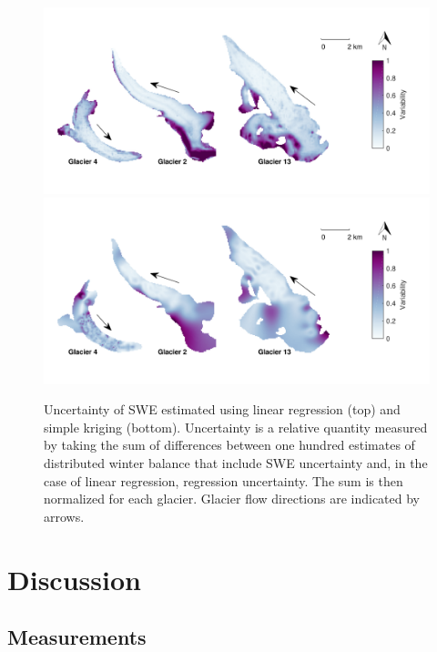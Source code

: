 \documentclass[twocolumn, letterpaper]{igs}
\begin{document}
\begin{figure}
	\centering
	\includegraphics[width =\textwidth]{SpatialVar_LR.pdf}\\
	\vspace{-20 mm}
	\includegraphics[width =\textwidth]{SpatialVar_SK.pdf}\\
	\caption{Uncertainty of SWE estimated using linear regression (top) and simple kriging (bottom). Uncertainty is a relative quantity measured by taking the sum of differences between one hundred estimates of distributed winter balance that include SWE uncertainty and, in the case of linear regression, regression uncertainty. The sum is then normalized for each glacier. Glacier flow directions are indicated by arrows.}
	\label{fig:WSMBspatialvar}
\end{figure}




\section{Discussion}

\subsection{Measurements}
\end{document}
